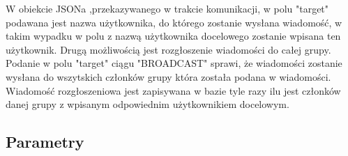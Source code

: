 \documentclass[11pt,a4paper,polish,thesis]{dcsbook}
\begin{document}
W obiekcie JSONa ,przekazywanego w trakcie komunikacji, w polu "target" podawana jest nazwa użytkownika, do którego zostanie wysłana wiadomość, w takim wypadku w polu z nazwą użytkownika docelowego zostanie wpisana ten użytkownik.
Drugą możliwością jest rozgłoszenie wiadomości do całej grupy. Podanie w polu "target" ciągu "BROADCAST" sprawi, że wiadomości zostanie wysłana do wszytskich członków grupy która została podana w wiadomości. 
Wiadomość rozgłoszeniowa jest zapisywana w bazie tyle razy ilu jest członków danej grupy z wpisanym odpowiednim użytkownikiem docelowym. 


\subsection{Parametry}
\end{document}
